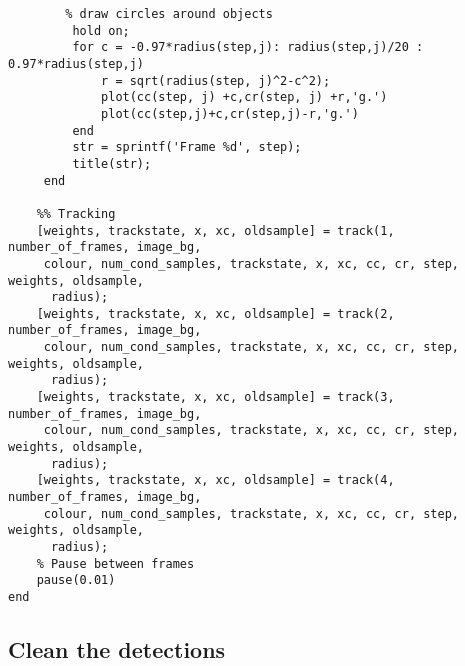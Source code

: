 \documentclass{article}
\begin{document}
\begin{lstlisting}
        % draw circles around objects
         hold on;
         for c = -0.97*radius(step,j): radius(step,j)/20 : 0.97*radius(step,j)
             r = sqrt(radius(step, j)^2-c^2);
             plot(cc(step, j) +c,cr(step, j) +r,'g.')
             plot(cc(step,j)+c,cr(step,j)-r,'g.')
         end
         str = sprintf('Frame %d', step);
         title(str);
     end

    %% Tracking    
    [weights, trackstate, x, xc, oldsample] = track(1, number_of_frames, image_bg,
     colour, num_cond_samples, trackstate, x, xc, cc, cr, step, weights, oldsample,
      radius);
    [weights, trackstate, x, xc, oldsample] = track(2, number_of_frames, image_bg,
     colour, num_cond_samples, trackstate, x, xc, cc, cr, step, weights, oldsample,
      radius);
    [weights, trackstate, x, xc, oldsample] = track(3, number_of_frames, image_bg,
     colour, num_cond_samples, trackstate, x, xc, cc, cr, step, weights, oldsample,
      radius);
    [weights, trackstate, x, xc, oldsample] = track(4, number_of_frames, image_bg,
     colour, num_cond_samples, trackstate, x, xc, cc, cr, step, weights, oldsample,
      radius);
    % Pause between frames
    pause(0.01)
end
\end{lstlisting}

\subsection{Clean the detections}

\end{document}
